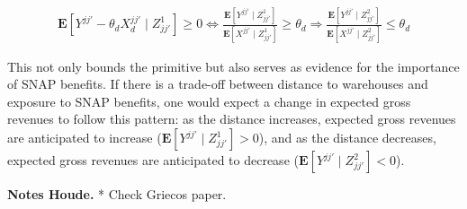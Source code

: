 \documentclass[11pt]{article}
\begin{document}
      \begin{align*}
          \mathbf{E}[Y^{jj'}-\theta_d X_d^{jj'} \mid Z^{1}_{jj'}] \geq 0 \iff \frac{\mathbf{E}[Y^{jj'}\mid Z^{1}_{jj'}]}{\mathbf{E}[X^{jj'}\mid Z^{1}_{jj'}]}\geq \theta_d  \Rightarrow \frac{\mathbf{E}[Y^{jj'}\mid Z^{2}_{jj'}]}{\mathbf{E}[X^{jj'}\mid Z^{2}_{jj'}]}\leq \theta_d 
      \end{align*}

    This not only bounds the primitive but also serves as evidence for the importance of SNAP benefits. If there is a trade-off between distance to warehouses and exposure to SNAP benefits, one would expect a change in expected gross revenues to follow this pattern: as the distance increases, expected gross revenues are anticipated to increase ($\mathbf{E}[Y^{jj'} \mid Z^{1}_{jj'}] > 0$), and as the distance decreases, expected gross revenues are anticipated to decrease ($\mathbf{E}[Y^{jj'} \mid Z^{2}_{jj'}] < 0$).



\textbf{Notes Houde.}
* Check Griecos paper. 



\end{document}
